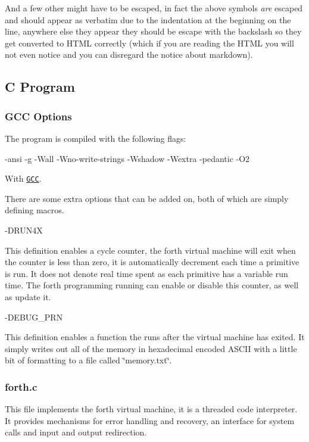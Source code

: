 And a few other might have to be escaped, in fact the above symbols {\itshape are} escaped and should appear as verbatim due to the indentation at the beginning on the line, anywhere else they appear they should be escape with the backslash so they get converted to H\-T\-M\-L correctly (which if you are reading the H\-T\-M\-L you will not even notice and you can disregard the notice about markdown).

\subsection*{C Program}

\subsubsection*{G\-C\-C Options}

The program is compiled with the following flags\-: \begin{DoxyVerb}-ansi -g -Wall -Wno-write-strings -Wshadow -Wextra -pedantic -O2
\end{DoxyVerb}


With \href{http://gcc.gnu.org/}{\tt G\-C\-C}.

There are some extra options that can be added on, both of which are simply defining macros. \begin{DoxyVerb}-DRUN4X
\end{DoxyVerb}


This definition enables a cycle counter, the forth virtual machine will exit when the counter is less than zero, it is automatically decrement each time a primitive is run. It does not denote real time spent as each primitive has a variable run time. The forth programming running can enable or disable this counter, as well as update it. \begin{DoxyVerb}-DEBUG_PRN
\end{DoxyVerb}


This definition enables a function the runs after the virtual machine has exited. It simply writes out all of the memory in hexadecimal encoded A\-S\-C\-I\-I with a little bit of formatting to a file called \char`\"{}memory.\-txt\char`\"{}.

\subsubsection*{forth.\-c}

This file implements the forth virtual machine, it is a threaded code interpreter. It provides mechanisms for error handling and recovery, an interface for system calls and input and output redirection.

